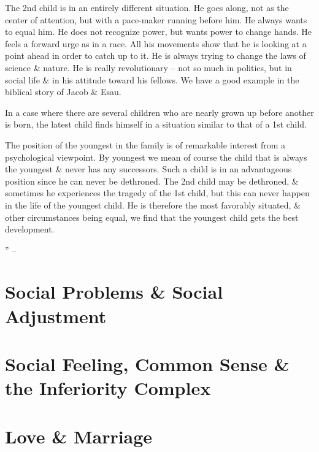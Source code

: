 \documentclass{article}
\numberwithin{equation}{section}
\begin{document}
The 2nd child is in an entirely different situation. He goes along, not as the center of attention, but with a pace-maker running before him. He always wants to equal him. He does not recognize power, but wants power to change hands. He feels a forward urge as in a race. All his movements show that he is looking at a point ahead in order to catch up to it. He is always trying to change the laws of science \& nature. He is really revolutionary -- not so much in politics, but in social life \& in his attitude toward his fellows. We have a good example in the biblical story of Jacob \& Esau.

In a case where there are several children who are nearly grown up before another is born, the latest child finds himself in a situation similar to that of a 1st child.

The position of the youngest in the family is of remarkable interest from a psychological viewpoint. By youngest we mean of course the child that is always the youngest \& never has any successors. Such a child is in an advantageous position since he can never be dethroned. The 2nd child may be dethroned, \& sometimes he experiences the tragedy of the 1st child, but this can never happen in the life of the youngest child. He is therefore the most favorably situated, \& other circumstances being equal, we find that the youngest child gets the best development. 

'' -- \cite[pp. 173--172]{Adler2013}


\section{Social Problems \& Social Adjustment}


\section{Social Feeling, Common Sense \& the Inferiority Complex}


\section{Love \& Marriage}
\end{document}
